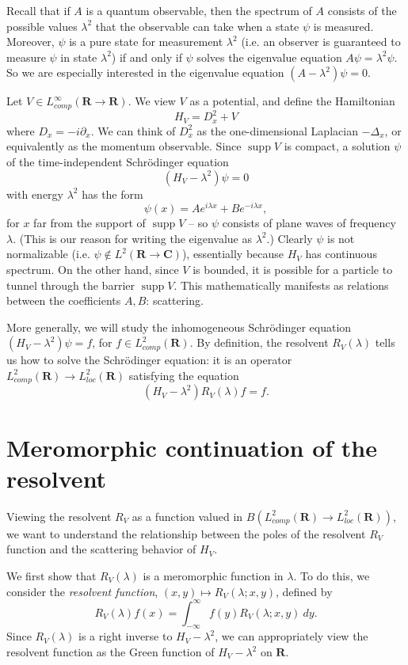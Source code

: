 \documentclass[12pt]{report}
\newcommand{\RR}{\mathbf{R}}
\newcommand{\CC}{\mathbf{C}}
\DeclareMathOperator{\supp}{supp}
\newcommand{\dfn}[1]{\emph{#1}\index{#1}}
\theoremstyle{definition}
\begin{document}
Recall that if $A$ is a quantum observable, then the spectrum of $A$ consists of the possible values $\lambda^2$ that the observable can take when a state $\psi$ is measured. Moreover, $\psi$ is a pure state for measurement $\lambda^2$ (i.e. an observer is guaranteed to measure $\psi$ in state $\lambda^2$) if and only if $\psi$ solves the eigenvalue equation $A\psi = \lambda^2 \psi$. So we are especially interested in the eigenvalue equation $(A - \lambda^2)\psi = 0$.

Let $V \in L^\infty_{comp}(\RR \to \RR)$. We view $V$ as a potential, and define the Hamiltonian
$$H_V = D_x^2 + V$$
where $D_x = -i\partial_x$. We can think of $D_x^2$ as the one-dimensional Laplacian $-\Delta_x$, or equivalently as the momentum observable. Since $\supp V$ is compact, a solution $\psi$ of the time-independent Schrödinger equation
$$(H_V - \lambda^2)\psi = 0$$
with energy $\lambda^2$ has the form
$$\psi(x) = Ae^{i\lambda x} + Be^{-i\lambda x},$$
for $x$ far from the support of $\supp V$ -- so $\psi$ consists of plane waves of frequency $\lambda$. (This is our reason for writing the eigenvalue as $\lambda^2$.) Clearly $\psi$ is not normalizable (i.e. $\psi \notin L^2(\RR \to \CC)$), essentially because $H_V$ has continuous spectrum. On the other hand, since $V$ is bounded, it is possible for a particle to tunnel through the barrier $\supp V$. This mathematically manifests as relations between the coefficients $A,B$: scattering.

More generally, we will study the inhomogeneous Schrödinger equation $(H_V - \lambda^2)\psi = f$, for $f \in L^2_{comp}(\RR)$. By definition, the resolvent $R_V(\lambda)$ tells us how to solve the Schrödinger equation: it is an operator $L^2_{comp}(\RR) \to L^2_{loc}(\RR)$ satisfying the equation
$$(H_V - \lambda^2)R_V(\lambda)f = f.$$

\section{Meromorphic continuation of the resolvent}
Viewing the resolvent $R_V$ as a function valued in $B(L^2_{comp}(\RR) \to L^2_{loc}(\RR))$, we want to understand the relationship between the poles of the resolvent $R_V$ function and the scattering behavior of $H_V$.

We first show that $R_V(\lambda)$ is a meromorphic function in $\lambda$. To do this, we consider the \dfn{resolvent function}, $(x, y) \mapsto R_V(\lambda; x, y)$, defined by
$$R_V(\lambda)f(x) = \int_{-\infty}^\infty f(y) R_V(\lambda; x, y) ~dy.$$
Since $R_V(\lambda)$ is a right inverse to $H_V - \lambda^2$, we can appropriately view the resolvent function as the Green function of $H_V - \lambda^2$ on $\RR$.
\end{document}
